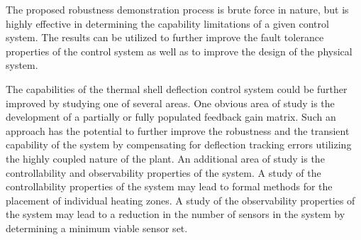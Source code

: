 \documentclass[a4paper, 10pt, conference]{ieeeconf}      %
\begin{document}
The proposed robustness demonstration process is brute force in nature, but is highly effective in determining the capability limitations of a given control system. The results can be utilized to further improve the fault tolerance properties of the control system as well as to improve the design of the physical system.

The capabilities of the thermal shell deflection control system could be further improved by studying one of several areas. One obvious area of study is the development of a partially or fully populated feedback gain matrix. Such an approach has the potential to further improve the robustness and the transient capability of the system by compensating for deflection tracking errors utilizing the highly coupled nature of the plant. An additional area of study is the controllability and observability properties of the system. A study of the controllability properties of the system may lead to formal methods for the placement of individual heating zones. A study of the observability properties of the system may lead to a reduction in the number of sensors in the system by determining a minimum viable sensor set.  

\addtolength{\textheight}{-12cm}   %










\end{document}
